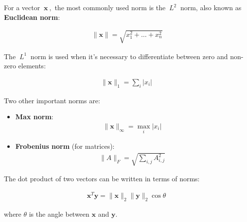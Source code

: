\documentclass[12pt]{article}
\begin{document}
For a vector $\ \mathbf{x} \ ,$ the most commonly used norm is the $\ L^{2} \ $ norm, also known as \textbf{Euclidean norm}:

\begin{align}
\ \|\mathbf{x}\| = \sqrt{x_1^2 + \dots + x_n^2}
\end{align}

The $\ L^{1} \ $ norm is used when it's necessary to differentiate between zero and non-zero elements:

\begin{align}
\|\mathbf{x}\|_{1} = \sum_{i} \left|x_{i}\right|
\end{align}

Two other important norms are:

\begin{itemize}
    \item \textbf{Max norm}:
    \begin{align}
    \|\mathbf{x}\|_{\infty} = \max_{i} \left|x_{i}\right|
    \end{align}
    \item \textbf{Frobenius norm} (for matrices):
    \begin{align}
    \|A\|_{F} = \sqrt{\sum_{i,j}A^{2}_{i,j}}
    \end{align}
\end{itemize}

The dot product of two vectors can be written in terms of norms:

\begin{align}
\mathbf{x}^{T}\mathbf{y} = \|\mathbf{x}\|_{2}\|\mathbf{y}\|_{2}\cos\theta
\end{align}

where $\theta$ is the angle between $\mathbf{x}$ and $\mathbf{y}$.
\end{document}
